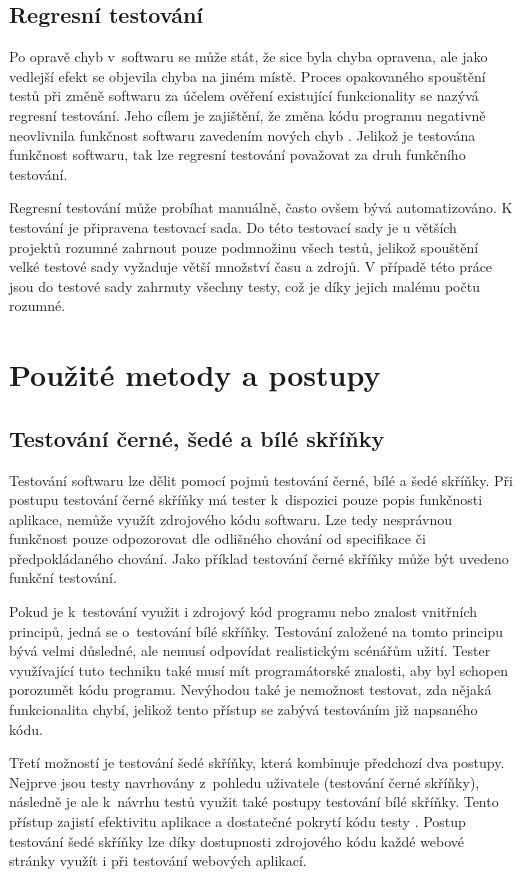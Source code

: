 \documentclass[
    color,   %
	table,   %
    twoside, %
    nolot, nolof
]{fithesis3}
\begin{document}
\subsection{Regresní testování}
Po opravě chyb v~softwaru se může stát, že sice byla chyba opravena, ale jako vedlejší efekt se objevila chyba na jiném místě. Proces opakovaného spouštění testů při změně softwaru za účelem ověření existující funkcionality se nazývá regresní testování. Jeho cílem je zajištění, že změna kódu programu negativně neovlivnila funkčnost softwaru zavedením nových chyb \cite{Myers}. Jelikož je testována funkčnost softwaru, tak lze regresní testování považovat za druh funkčního testování. 

Regresní testování může probíhat manuálně, často ovšem bývá automatizováno. K testování je připravena testovací sada. Do této testovací sady je u větších projektů rozumné zahrnout pouze podmnožinu všech testů, jelikož spouštění velké testové sady vyžaduje větší množství času a zdrojů. V případě této práce jsou do testové sady zahrnuty všechny testy, což je díky jejich malému počtu rozumné.

\section{Použité metody a postupy}
\subsection{Testování černé, šedé a bílé skříňky}
Testování softwaru lze dělit pomocí pojmů testování černé, bílé a šedé skříňky. Při postupu testování černé skříňky má tester k~dispozici pouze popis funkčnosti aplikace, nemůže využít zdrojového kódu softwaru. Lze tedy nesprávnou funkčnost pouze odpozorovat dle odlišného chování od specifikace či předpokládaného chování. Jako příklad testování černé skříňky může být uvedeno funkční testování.

Pokud je k~testování využit i zdrojový kód programu nebo znalost vnitřních principů, jedná se o~testování bílé skříňky. Testování založené na tomto principu bývá velmi důsledné, ale nemusí odpovídat realistickým scénářům užití. Tester využívající tuto techniku také musí mít programátorské znalosti, aby byl schopen porozumět kódu programu. Nevýhodou také je nemožnost testovat, zda nějaká funkcionalita chybí, jelikož tento přístup se zabývá testováním již napsaného kódu.

Třetí možností je testování šedé skříňky, která kombinuje předchozí dva postupy. Nejprve jsou testy navrhovány z~pohledu uživatele (testování černé skříňky), následně je ale k~návrhu testů využit také postupy testování bílé skříňky. Tento přístup zajistí efektivitu aplikace a dostatečné pokrytí kódu testy \cite{Page}. Postup testování šedé skříňky lze díky dostupnosti zdrojového kódu každé webové stránky využít i při testování webových aplikací.
\end{document}
